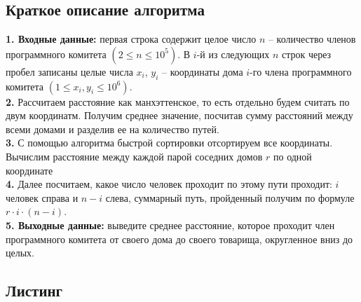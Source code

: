 \documentclass[a5paper, 10pt]{article}
\theoremstyle{definition}
\theoremstyle{plain}
\theoremstyle{remark}
\begin{document}
\subsection{Краткое описание алгоритма}
\textbf{1. Входные данные:} первая строка содержит целое число $n$ -- количество членов программного комитета $(2 \leq n \leq 10^5)$. В $i$-й из следующих $n$ строк через пробел записаны целые числа $x_i$, $y_i$ -- координаты дома $i$-го члена программного комитета $(1 \leq x_i , y_i \leq 10^6)$.\\
\textbf{2.} Рассчитаем расстояние как манхэттенское, то есть отдельно будем считать по двум координатм. Получим среднее значение, посчитав сумму расстояний между всеми домами и разделив ее на количество путей. \\
\textbf{3.} С помощью алгоритма быстрой сортировки отсортируем все координаты. Вычислим расстояние между каждой парой соседних домов $r$ по одной координате   \\
\textbf{4.} Далее посчитаем, какое число человек проходит по этому пути проходит: $i$ человек справа и $n - i$ слева, суммарный путь, пройденный получим по формуле $r \cdot i \cdot (n - i)$.\\
\textbf{5. Выходные данные:} выведите среднее расстояние, которое проходит член программного комитета от своего дома до своего товарища, округленное вниз до целых.

\subsection{Листинг}
\end{document}
